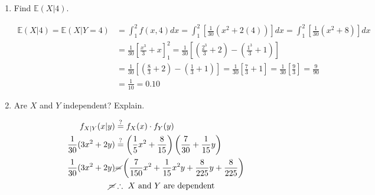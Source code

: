 \begin{enumerate}[label=(\alph*)]
        \item Find $\mathbb{E}(X|4)$.
        \\
        \begin{mdframed}
            \begin{align*}
                \mathbb{E}(X|4) = \mathbb{E}(X|Y=4) & = \int_{1}^{2}f(x,4)dx                                
                                                    = \int_{1}^{2}\left[\frac{1}{30}(x^2+2(4))\right]dx     
                                                    = \int_{1}^{2}\left[\frac{1}{30}(x^2+8)\right]dx        \\
                                                    & = \frac{1}{30}\left[\frac{x^3}{3}+x\right]_{1}^{2}    
                                                    = \frac{1}{30}\left[\left(\frac{2^3}{3}+2\right) - \left(\frac{1^3}{3}+1\right)\right]  \\
                                                    & = \frac{1}{30}\left[\left(\frac{8}{3}+2\right) - \left(\frac{1}{3}+1\right)\right]
                                                    = \frac{1}{30}\left[\frac{7}{3}+1\right]
                                                    = \frac{1}{30}\left[\frac{9}{3}\right] = \frac{9}{90}   \\
                                                    & = \boxed{\frac{1}{10} = 0.10}
            \end{align*}
        \end{mdframed}
        
        \item Are $X$ and $Y$ independent? Explain.
        \\
        \begin{mdframed}
            \begin{align*}
                f_{X|Y}(x|y)    & \stackrel{?}{=} f_{X}(x) \cdot f_{Y}(y)   \\
                \frac{1}{30}(3x^{2}+2y) & \stackrel{?}{=} \left(\frac{1}{5}x^{2} + \frac{8}{15}\right)\left(\frac{7}{30} + \frac{1}{15}y\right) \\
                \frac{1}{30}(3x^{2}+2y) & \cancel{=} \left(\frac{7}{150}x^{2}+\frac{1}{15}x^{2}y+\frac{8}{225}y+\frac{8}{225}\right)    \\
                \cancel{=}      & \therefore \text{ $X$ and $Y$ are dependent}
            \end{align*}
        \end{mdframed}
    \end{enumerate}

